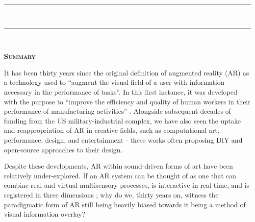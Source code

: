 
\thispagestyle{empty}

 \begin{center}

    {\rule{\linewidth}{1pt}\\%
    \Large \myTitle \par %
    \normalsize \mySubtitle \par}
    \rule{\linewidth}{1pt}\\[0.4cm]
    
	{\normalsize \myName \par} %
 \end{center}

    {\noindent\Huge\textsc{\textbf{Summary}} \par}

    \noindent It has been thirty years since the original definition of augmented reality (AR) as a technology used to ``augment the visual field of a user with information necessary in the performance of tasks''. In this first instance, it was developed with the purpose to ``improve the efficiency and quality of human workers in their performance of manufacturing activities'' \citep{caudell1992}. Alongside subsequent decades of funding from the US military-industrial complex, we have also seen the uptake and reappropriation of AR in creative fields, such as computational art, performance, design, and entertainment - these works often proposing DIY and open-source approaches to their design. 
    
    \noindent Despite these developments, AR within sound-driven forms of art have been relatively under-explored. If an AR system can be thought of as one that can combine real and virtual multisensory processes, is interactive in real-time, and is registered in three dimensions \citep{azuma1997}; why do we, thirty years on, witness the paradigmatic form of AR still being heavily biased \citep{billinghurst2015} towards it being a method of visual information overlay?
    
